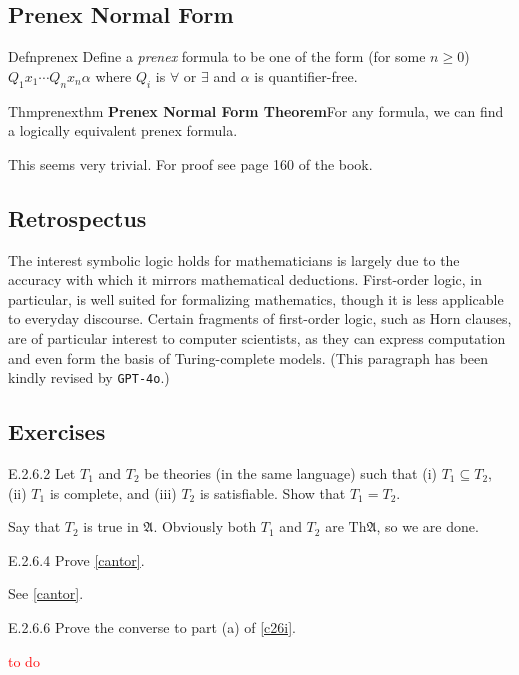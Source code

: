 \subsection*{Prenex Normal Form}

\begin{reference}{Defn}{prenex}
  Define a \textit{prenex} formula to be one of the form (for some $n\geq0$) $Q_1x_1\cdots Q_nx_n \alpha$ where $Q_i$ is $\forall$ or $\exists$ and $\alpha$ is quantifier-free.
\end{reference}

\begin{reference}{Thm}{prenexthm}
  \textbf{Prenex Normal Form Theorem}\quad For any formula, we can find a logically equivalent prenex formula.
\end{reference}

This seems very trivial. For proof see page 160 of the book.

\subsection*{Retrospectus}

The interest symbolic logic holds for mathematicians is largely due to the accuracy with which it mirrors mathematical deductions. First-order logic, in particular, is well suited for formalizing mathematics, though it is less applicable to everyday discourse. Certain fragments of first-order logic, such as Horn clauses, are of particular interest to computer scientists, as they can express computation and even form the basis of Turing-complete models. (This paragraph has been kindly revised by \texttt{GPT-4o}.)

\subsection*{Exercises}

\setcounter{exercise}{1}

\begin{exercise}{E.2.6.2}
  Let $T_1$ and $T_2$ be theories (in the same language) such that (i) $T_1\subseteq T_2$, (ii) $T_1$ is complete, and (iii) $T_2$ is satisfiable. Show that $T_1=T_2$.
\end{exercise}

Say that $T_2$ is true in $\mathfrak{A}$. Obviously both $T_1$ and $T_2$ are $\mathrm{Th}\mathfrak{A}$, so we are done.

\setcounter{exercise}{3}

\begin{exercise}{E.2.6.4}
  Prove \ref{cantor}.
\end{exercise}

See \ref{cantor}.

\setcounter{exercise}{5}

\begin{exercise}{E.2.6.6}
  Prove the converse to part (a) of \ref{c26i}.
\end{exercise}

\textcolor{red}{to do}

